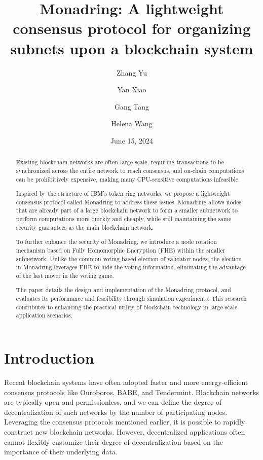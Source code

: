 \documentclass[11pt]{article}
\begin{document}
\title{Monadring: A lightweight consensus protocol for organizing subnets upon a blockchain system}
\author[*]{Zhang Yu}
\author[*]{Yan Xiao}
\author[*]{Gang Tang}
\author[*]{Helena Wang}
\date{June 15, 2024}
\maketitle

\begin{abstract}
Existing blockchain networks are often large-scale, requiring transactions to be synchronized across the entire network to reach consensus, and on-chain computations can be prohibitively expensive, making many CPU-sensitive computations infeasible.

Inspired by the structure of IBM's token ring networks, we propose a lightweight consensus protocol called Monadring to address these issues. Monadring allows nodes that are already part of a large blockchain network to form a smaller subnetwork to perform computations more quickly and cheaply, while still maintaining the same security guarantees as the main blockchain network.

To further enhance the security of Monadring, we introduce a node rotation mechanism based on Fully Homomorphic Encryption (FHE) within the smaller subnetwork. Unlike the common voting-based election of validator nodes, the election in Monadring leverages FHE to hide the voting information, eliminating the advantage of the last mover in the voting game.

The paper details the design and implementation of the Monadring protocol, and evaluates its performance and feasibility through simulation experiments. This research contributes to enhancing the practical utility of blockchain technology in large-scale application scenarios.
\end{abstract}

\section{Introduction}
Recent blockchain systems have often adopted faster and more energy-efficient consensus protocols like Ouroboros, BABE, and Tendermint.
Blockchain networks are typically open and permissionless, and we can define the degree of decentralization of such networks by the number of participating nodes.
Leveraging the consensus protocols mentioned earlier, it is possible to rapidly construct new blockchain networks.
However, decentralized applications often cannot flexibly customize their degree of decentralization based on the importance of their underlying data.
\end{document}
